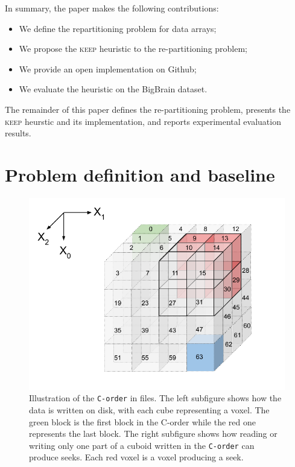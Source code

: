 \documentclass[sigconf, nonacm]{acmart}
\newcommand{\keep}[0]{\textsc{keep}\xspace}
\begin{document}
In summary, the paper makes the following contributions:
\begin{itemize}
  \item We define the repartitioning problem for data arrays;
  \item We propose the \keep heuristic to the re-partitioning problem;
  \item We provide an open implementation on Github;
  \item We evaluate the heuristic on the BigBrain dataset.
\end{itemize}
The remainder of this paper defines the re-partitioning problem, presents the \keep heurstic and its implementation,
and reports experimental evaluation results.




\section{Problem definition and baseline}
\begin{figure}[h]
  \centering
  \includegraphics[scale=0.32]{./figures/figure_1.png}
  \caption{Illustration of the \texttt{C-order} in files. The left subfigure
  shows how the data is written on disk, with each cube representing a voxel.
  The green block is the first block in the C-order while the red one represents the last block.
  The right subfigure shows how reading or writing only one part of a cuboid written
  in the \texttt{C-order} can produce seeks. Each red voxel is a voxel producing a seek.}
  \label{fig:seeks_and_rowmajor}
\end{figure}
\end{document}
